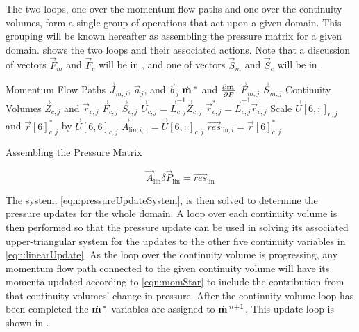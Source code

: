 The two loops, one over the momentum flow paths and one over the continuity volumes, form a single group of operations that act upon a given domain.
This grouping will be known hereafter as assembling the pressure matrix for a given domain.
 shows the two loops and their associated actions.
Note that a discussion of vectors $\vec{F}_{m}$ and $\vec{F}_{c}$ will be in , and one of vectors $\vec{S}_{m}$ and $\vec{S}_{c}$ will be in .

\begin{algo}[ht!]
\setlength{\baselineskip}{0.625\baselineskip}
\begin{algorithmic}[1]
\Loop \; Momentum Flow Paths
	\Calculate $\vec{J}_{m, j}$, $\vec{a}_{j}$, and $\vec{b}_{j}$
	\Calculate $\momVec{}^{*}$ and $\frac{\partial \momVec{}}{\partial P}$
	\Calculate $\vec{F}_{m, j}$	
	\Calculate $\vec{S}_{m, j}$	
\EndLoop
\Loop \; Continuity Volumes
   	\Calculate $\vec{Z}_{c,j}$ and $\vec{r}_{c, j}$
 	\Calculate $\vec{F}_{c, j}$	
	\Calculate $\vec{S}_{c, j}$	
   	\Calculate $\vec{U}_{c, j} = \vec{L}_{c, j}^{-1} \vec{Z}_{c, j}$
   	\Calculate $\vec{r}^{*}_{c, j} = \vec{L}_{c, j}^{-1} \vec{r}_{c, j}$
   	\Set Scale $\vec{U}[6, :]_{c, j}$ and $\vec{r}[6]^{*}_{c, j}$ by $\vec{U}[6,6]_{c, j}$
   	\Set $\vec{A}_{\text{lin},i, :} = \vec{U}[6,:]_{c, j}$
   	\Set $\vec{res}_{\text{lin},i} = \vec{r}[6]^{*}_{c, j}$
\EndLoop
\end{algorithmic}
\caption{Assembling the Pressure Matrix}
\label{alg:xschem}
\end{algo}

\begin{equation}
\label{eqn:pressureUpdateSystem}
\vec{A}_{\text{lin}} \delta \vec{P}_{\text{lin}} = \vec{res}_{\text{lin}}
\end{equation}

The system, \eqref{eqn:pressureUpdateSystem}, is then solved to determine the pressure updates for the whole domain.
A loop over each continuity volume is then performed so that the pressure update can be used in solving its associated upper-triangular system for the updates to the other five continuity variables in \eqref{eqn:linearUpdate}.
As the loop over the continuity volume is progressing, any momentum flow path connected to the given continuity volume will have its momenta updated according to \eqref{eqn:momStar} to include the contribution from that continuity volumes' change in pressure. 
After the continuity volume loop has been completed the $\momVec{}^{*}$ variables are assigned to $\momVec{}^{n+1}$. 
This update loop is shown in .

